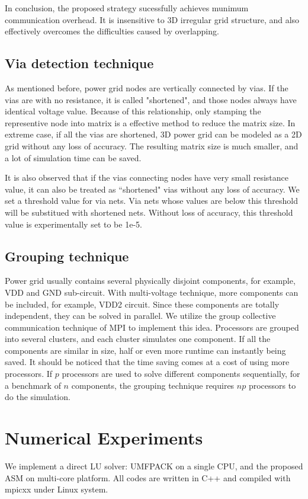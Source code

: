 \documentclass{sig-alternate}
\begin{document}
	In conclusion, the proposed strategy sucessfully achieves munimum communication overhead. It is insensitive to 3D irregular 
	grid structure, and also effectively overcomes the difficulties caused by overlapping.	
  \subsection{Via detection technique}
	As mentioned before, power grid nodes are vertically connected by vias. If the vias are with no 
	resistance, it is called "shortened", and those nodes always have identical voltage value. Because of this relationship, 
	only stamping the representive
	node into matrix is a effective method to reduce the matrix size. In extreme case, if all the
	vias are shortened, 3D power grid can be modeled as a 2D grid without any loss of accuracy. The resulting matrix size
	is much smaller, and a lot of simulation time can be saved. 
 
	It is also observed that if the vias connecting nodes have very small resistance value, it can also be treated as ``shortened" vias 
	without any loss of accuracy. We set a threshold value for via nets. Via nets 
	whose values are below this threshold will be substitued with shortened nets. Without loss of accuracy, this threshold value 
	is experimentally set to be 1e-5. 
  \subsection{Grouping technique} 
	Power grid usually contains several physically disjoint components, for example, VDD and GND sub-circuit. With multi-voltage 
	technique, more components can be included, for example, VDD2 circuit. Since these components are totally independent, they can
	be solved in parallel. We utilize the group collective 
	communication technique of MPI to implement this idea. Processors are grouped into several clusters, and each cluster 
	simulates one component. 
	If all the components are similar in size, half or even more runtime can instantly being saved. 
	It should be noticed that the time saving comes at a cost of using more processors. If $p$ processors are used to 
	solve different components sequentially, for a benchmark of $n$ components, the grouping technique requires $np$ processors to
	do the simulation.  
\section{Numerical Experiments}
	We implement a direct LU solver: UMFPACK on a single CPU, and the proposed ASM on multi-core platform. 
	All codes are written in C++ and compiled with mpicxx under Linux system. 
\end{document}
